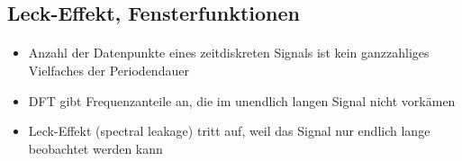 \subsection{Leck-Effekt, Fensterfunktionen}
\begin{frame}{\insertsection}
	\framesubtitle{\insertsubsection}
	
	\begin{itemize}
		\item Anzahl der Datenpunkte eines zeitdiskreten Signals ist kein ganzzahliges Vielfaches der Periodendauer
		\item DFT gibt Frequenzanteile an, die im unendlich langen Signal nicht vorkämen
		\item Leck-Effekt (spectral leakage) tritt auf, weil das Signal nur endlich lange beobachtet werden kann
	\end{itemize}
	

\end{frame}
